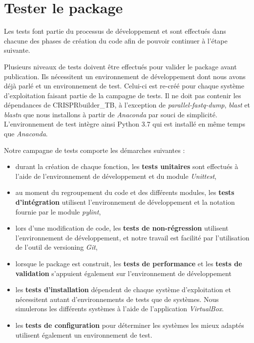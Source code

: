\documentclass[twoside,a4paper,11pt,frenchb,openany]{report}
\begin{document}
\chapter{Tester le package}

Les tests font partie du processus de développement et sont effectués dans chacune des phases de création du code afin de pouvoir continuer à l'étape suivante.

Plusieurs niveaux de tests doivent être effectués pour valider le package avant publication. Ils nécessitent un environnement de développement dont nous avons déjà parlé et un environnement de test. Celui-ci est re-créé pour chaque système d'exploitation faisant partie de la campagne de tests. Il ne doit pas contenir les dépendances de CRISPRbuilder\_TB, à l'exception de \textit{parallel-fastq-dump}, \textit{blast} et \textit{blastn} que nous installons à partir de \textit{Anaconda} par souci de simplicité. L'environnement de test intègre ainsi Python 3.7 qui est installé en même temps que \textit{Anaconda}.

Notre campagne de tests comporte les démarches suivantes :
\begin{itemize}
\item durant la création de chaque fonction, les \textbf{tests unitaires} sont effectués à l'aide de l'environnement de développement et du module \textit{Unittest},
\item au moment du regroupement du code et des différents modules, les \textbf{tests d'intégration} utilisent l'environnement de développement et la notation fournie par le module \textit{pylint},
\item lors d'une modification de code, les \textbf{tests de non-régression} utilisent l'environnement de développement, et notre travail est facilité par l'utilisation de l'outil de versioning \textit{Git},
\item lorsque le package est construit, les \textbf{tests de performance} et les \textbf{tests de validation} s'appuient également sur l'environnement de développement
\item les \textbf{tests d'installation} dépendent de chaque système d'exploitation et nécessitent autant d'environnements de tests que de systèmes. Nous simulerons les différents systèmes à l'aide de l'application \textit{VirtualBox}.
\item les \textbf{tests de configuration} pour déterminer les systèmes les mieux adaptés utilisent également un environnement de test.
\end{itemize}
\end{document}
